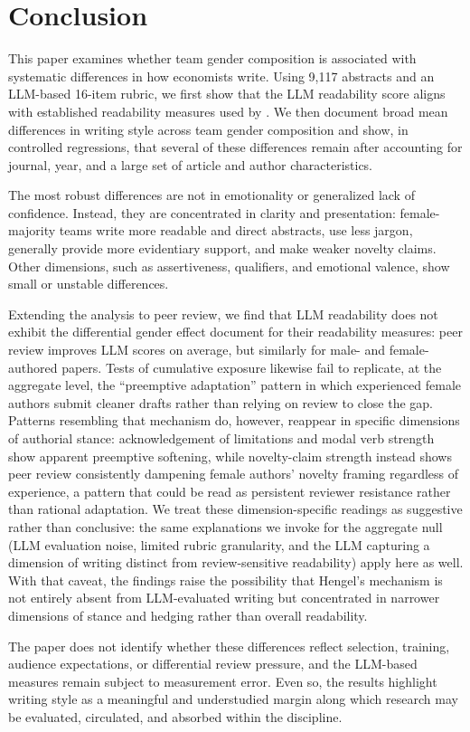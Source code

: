 \section{Conclusion}\label{sec:conclusion}

This paper examines whether team gender composition is associated with systematic differences in how economists write. Using 9,117 abstracts and an LLM-based 16-item rubric, we first show that the LLM readability score aligns with established readability measures used by \textcite{hengel2022publishing}. We then document broad mean differences in writing style across team gender composition and show, in controlled regressions, that several of these differences remain after accounting for journal, year, and a large set of article and author characteristics.

The most robust differences are not in emotionality or generalized lack of confidence. Instead, they are concentrated in clarity and presentation: female-majority teams write more readable and direct abstracts, use less jargon, generally provide more evidentiary support, and make weaker novelty claims. Other dimensions, such as assertiveness, qualifiers, and emotional valence, show small or unstable differences.

Extending the analysis to peer review, we find that LLM readability does not exhibit the differential gender effect \textcite{hengel2022publishing} document for their readability measures: peer review improves LLM scores on average, but similarly for male- and female-authored papers. Tests of cumulative exposure likewise fail to replicate, at the aggregate level, the ``preemptive adaptation'' pattern in which experienced female authors submit cleaner drafts rather than relying on review to close the gap. Patterns resembling that mechanism do, however, reappear in specific dimensions of authorial stance: acknowledgement of limitations and modal verb strength show apparent preemptive softening, while novelty-claim strength instead shows peer review consistently dampening female authors' novelty framing regardless of experience, a pattern that could be read as persistent reviewer resistance rather than rational adaptation. We treat these dimension-specific readings as suggestive rather than conclusive: the same explanations we invoke for the aggregate null (LLM evaluation noise, limited rubric granularity, and the LLM capturing a dimension of writing distinct from review-sensitive readability) apply here as well. With that caveat, the findings raise the possibility that Hengel's mechanism is not entirely absent from LLM-evaluated writing but concentrated in narrower dimensions of stance and hedging rather than overall readability.

The paper does not identify whether these differences reflect selection, training, audience expectations, or differential review pressure, and the LLM-based measures remain subject to measurement error. Even so, the results highlight writing style as a meaningful and understudied margin along which research may be evaluated, circulated, and absorbed within the discipline.